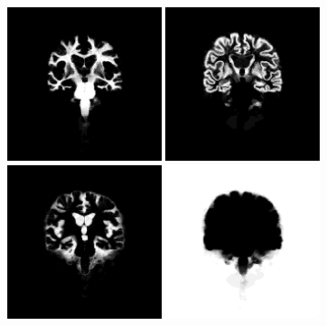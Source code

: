 \documentclass[10pt,twoside]{book}
\begin{document}
\begin{figure}
\begin{subfigure}{0.64\textwidth}
    \caption{\\[5ex]}
    \label{fig:probabilisticAtlas_a}
  \end{subfigure}
  \begin{subfigure}{0.64\textwidth}
    \centering
      \includegraphics[width=0.49\textwidth]{tissueAtlas_warp_tissueNumber2}
      \includegraphics[width=0.49\textwidth]{tissueAtlas_warp_tissueNumber3}
      \includegraphics[width=0.49\textwidth]{tissueAtlas_warp_tissueNumber4}
      \includegraphics[width=0.49\textwidth]{tissueAtlas_warp_tissueNumber1}

\end{subfigure}
\end{figure}
\end{document}
